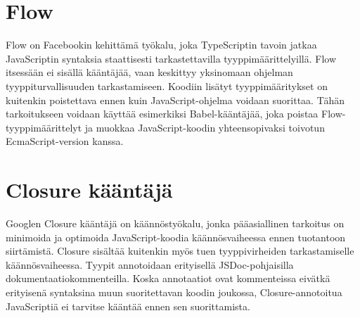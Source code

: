 \section{Flow}
Flow on Facebookin kehittämä työkalu, joka TypeScriptin tavoin jatkaa
JavaScriptin syntaksia staattisesti tarkastettavilla tyyppimäärittelyillä.
Flow itsessään ei sisällä kääntäjää, vaan keskittyy yksinomaan ohjelman
tyyppiturvallisuuden tarkastamiseen. Koodiin lisätyt tyyppimääritykset on
kuitenkin poistettava ennen kuin JavaScript-ohjelma voidaan suorittaa. Tähän
tarkoitukseen voidaan käyttää esimerkiksi Babel-kääntäjää, joka poistaa
Flow-tyyppimäärittelyt ja muokkaa JavaScript-koodin yhteensopivaksi toivotun
EcmaScript-version kanssa\cite{FlowInstallation}.

\section{Closure kääntäjä}
Googlen Closure kääntäjä on käännöstyökalu, jonka pääasiallinen tarkoitus
on minimoida ja optimoida JavaScript-koodia käännösvaiheessa ennen tuotantoon
siirtämistä. Closure sisältää kuitenkin myös tuen tyyppivirheiden
tarkastamiselle käännösvaiheessa\cite{ClosureCompiler}. Tyypit annotoidaan
erityisellä JSDoc-pohjaisilla dokumentaatiokommenteilla. Koska annotaatiot
ovat kommenteissa eivätkä erityisenä syntaksina muun suoritettavan koodin
joukossa, Closure-annotoitua JavaScriptiä ei tarvitse kääntää ennen sen
suorittamista\cite{annotatingJSforClosure}.
